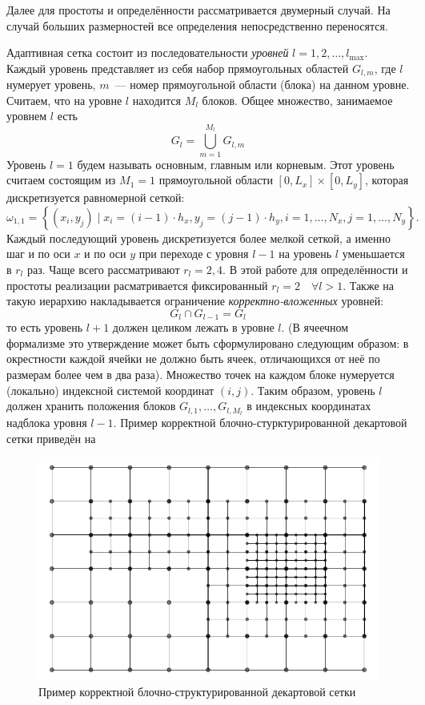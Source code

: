 Далее для простоты и определённости рассматривается двумерный случай.
На случай больших размерностей все определения непосредственно переносятся.

Адаптивная сетка состоит из последовательности \emph{уровней} $l = 1, 2, \ldots, l_{\text{max}}$.
Каждый уровень представляет из себя набор прямоугольных областей $G_{l, m}$, где $l$ нумерует уровень, $m$~--- номер прямоугольной области (блока) на данном уровне.
Считаем, что на уровне $l$ находится $M_l$ блоков.
Общее множество, занимаемое уровнем $l$ есть
\begin{equation*}
    G_{l} = \bigcup_{m = 1}^{M_{l}} G_{l, m}
\end{equation*}
Уровень $l = 1$ будем называть основным, главным или корневым.
Этот уровень считаем состоящим из $M_{1} = 1$ прямоугольной области $[0, L_x] \times [0, L_y]$, которая дискретизуется равномерной сеткой:
\begin{equation*}
    \omega_{1, 1} = \left\{ (x_i, y_j) \mid x_i = (i - 1) \cdot h_x, y_j = (j - 1) \cdot h_y, i = 1, \ldots, N_x, j = 1, \ldots, N_y \right\}.
\end{equation*}
Каждый последующий уровень дискретизуется более мелкой сеткой, а именно шаг и по оси $x$ и по оси $y$ при переходе с уровня $l - 1$ на уровень $l$ уменьшается в $r_{l}$ раз.
Чаще всего рассматривают $r_{l} = 2, 4$.
В этой работе для определённости и простоты реализации расматривается фиксированный $r_l = 2 \quad \forall l > 1$.
Также на такую иерархию накладывается ограничение \emph{корректно-вложенных} уровней:
\begin{equation*}
    G_{l} \cap G_{l - 1} = G_{l}
\end{equation*}
то есть уровень $l + 1$ должен целиком лежать в уровне $l$.
(В ячеечном формализме это утверждение может быть сформулировано следующим образом: в окрестности каждой ячейки не должно быть ячеек, отличающихся от неё по размерам более чем в два раза).
Множество точек на каждом блоке нумеруется (локально) индексной системой координат $(i, j)$.
Таким образом, уровень $l$ должен хранить положения блоков $G_{l, 1}, \ldots, G_{l, M_{l}}$ в индексных координатах надблока уровня $l - 1$.
Пример корректной блочно-стурктурированной декартовой сетки приведён на 
\begin{figure}
    \centering
    \includegraphics{Теория_блочных_локально_адаптивных_сеток/Топология_сетки/grid_topology.pdf}
    \caption{Пример корректной блочно-структурированной декартовой сетки}
    \label{fig:example_BSG}
\end{figure}
